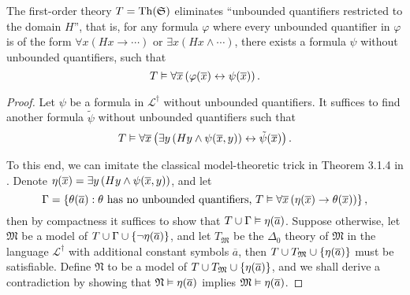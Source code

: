 \documentclass[11pt]{article}
\theoremstyle{plain}
\theoremstyle{definition}
\DeclareMathOperator{\Th}{Th}
\begin{document}
\begin{lemma}
  The first-order theory $T = \Th\mleft(\mathfrak{S}\mright)$ eliminates ``unbounded quantifiers restricted to the domain $H$'', that is, for any formula $\varphi$ where every unbounded quantifier in $\varphi$ is of the form $\forall x \left(Hx \rightarrow \cdots\right)$ or $\exists x \left(Hx \land \cdots\right)$, there exists a formula $\psi$ without unbounded quantifiers, such that
  \[T \vDash \forall \overline{x} \left(\varphi\mleft(\overline{x}\mright) \leftrightarrow \psi\mleft(\overline{x}\mright)\right).\]
\end{lemma}

\begin{proof}
  Let $\psi$ be a formula in $\mathcal{L}^\dagger$ without unbounded quantifiers. It suffices to find another formula $\tilde{\psi}$ without unbounded quantifiers such that
  \[T \vDash \forall \overline{x} \left(\exists y \left(Hy \land \psi\mleft(\overline{x}, y\mright)\right) \leftrightarrow \tilde{\psi}\mleft(\overline{x}\mright)\right).\]

  To this end, we can imitate the classical model-theoretic trick in Theorem 3.1.4 in \cite{marker02-model-theory}. Denote $\eta\mleft(\overline{x}\mright) = \exists y \left(Hy \land \psi\mleft(\overline{x}, y\mright)\right)$, and let
  \[\Gamma = \left\{\theta\mleft(\overline{a}\mright) : \text{$\theta$ has no unbounded quantifiers, $T \vDash \forall \overline{x} \left(\eta\mleft(\overline{x}\mright) \rightarrow \theta\mleft(\overline{x}\mright)\right)$}\right\},\]
  then by compactness it suffices to show that $T \cup \Gamma \vDash \eta\mleft(\overline{a}\mright)$. Suppose otherwise, let $\mathfrak{M}$ be a model of $T \cup \Gamma \cup \left\{\neg \eta\mleft(\overline{a}\mright)\right\}$, and let $T_\mathfrak{M}$ be the $\Delta_0$ theory of $\mathfrak{M}$ in the language $\mathcal{L}^\dagger$ with additional constant symbols $\overline{a}$, then $T \cup T_\mathfrak{M} \cup \left\{\eta\mleft(\overline{a}\mright)\right\}$ must be satisfiable. Define $\mathfrak{N}$ to be a model of $T \cup T_\mathfrak{M} \cup \left\{\eta\mleft(\overline{a}\mright)\right\}$, and we shall derive a contradiction by showing that $\mathfrak{N} \vDash \eta\mleft(\overline{a}\mright)$ implies $\mathfrak{M} \vDash \eta\mleft(\overline{a}\mright)$.


\end{proof}
\end{document}
